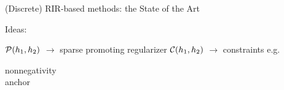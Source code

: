 \begin{frame}{(Discrete) RIR-based methods: the State of the Art \hfill\faBook}
\begin{block}{Ideas:}
\begin{enumerate}
\begin{mysotablock}
            \vspace*{-2mm}
            \begin{center}
                \footnotesize
                $\mathcal{P}(h_1, h_2)$ $\longrightarrow$ sparse promoting regularizer
                \hspace{5mm} \footnotesize $\mathcal{C}(h_1, h_2)$ $\longrightarrow$ constraints e.g. \parbox{6em}{nonnegativity\\anchor}
            \end{center}
        \end{mysotablock}

    \end{enumerate}
    \end{block}

    \vspace{-12mm}
    \begin{block}{}
        \begin{center}
            \small
            \textcolor{mygreen}{\cmark}  \cite{tong1994blind} \qquad \textcolor{mygreen}{\cmark}  \cite{lin2008blind} \qquad \textcolor{mygreen}{\cmark} \cite{aissa2008blind} \\
            \textcolor{mygreen}{\cmark} \cite{kowalczyk2013blind} \qquad \textcolor{mygreen}{\cmark} \cite{crocco2016estimation}
        \end{center}
    \end{block}

 \end{frame}


